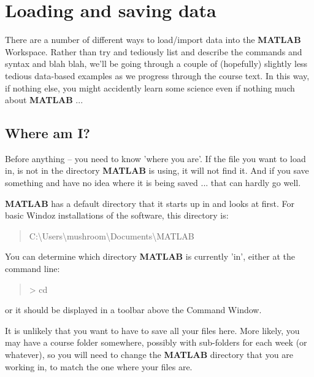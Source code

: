 \documentclass{tufte-book} %
\newenvironment{docspec}{\begin{quotation}\ttfamily\parskip0pt\parindent0pt\ignorespaces}{\end{quotation}}
\begin{document}
\section{Loading and saving data}

There are a number of different ways to load/import data into the \textbf{MATLAB} \textsf{Workspace}. Rather than try and tediously list and describe the commands and syntax and blah blah, we'll be going through a couple of (hopefully) slightly less tedious data-based examples as we progress through the course text. In this way, if nothing else, you might accidently learn some science even if nothing much about \textbf{MATLAB} ...


\subsection{Where am I?}

Before anything -- you need to know 'where you are'. If the file you want to load in, is not in the directory \textbf{MATLAB} is using, it will not find it. And if you save something and have no idea where it is being saved ... that can hardly go well.

\textbf{MATLAB} has a default directory that it starts up in and looks at first. For basic Windoz installations of the software, this directory is:

\begin{docspec}
C:\textbackslash Users\textbackslash mushroom\textbackslash Documents\textbackslash MATLAB
\end{docspec}

You can determine which directory \textbf{MATLAB} is currently 'in', either at the command line:

\begin{docspec}
> cd
\end{docspec}

\noindent or it should be displayed in a toolbar above the \textsf{Command Window}. 

It is unlikely that you want to have to save all your files here. More likely, you may have a course folder somewhere, possibly with sub-folders for each week (or whatever), so you will need to change the \textbf{MATLAB} directory that you are working in, to match the one where your files are. 
\end{document}
